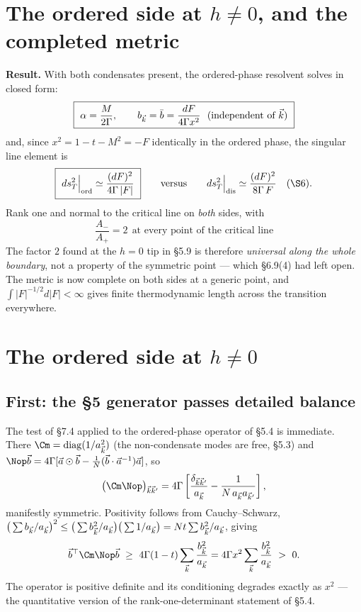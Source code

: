 \section{ The ordered side at $h\neq0$, and the completed metric}

\medskip
\noindent
\textbf{Result.} With both condensates present, the ordered-phase resolvent solves in closed
form:
\begin{equation}
  \boxed{\ \alpha=\frac{M}{2\Gamma},\qquad
   b_{\vec k}=\bar b=\frac{dF}{4\Gamma x^{2}}\ \ \text{(independent of }\vec k)\ }
\end{equation}
and, since $x^{2}=1-t-M^{2}=-F$ identically in the ordered phase, the singular line element
is
\begin{equation}
  \boxed{\ ds_T^{2}\Big|_{\rm ord}\simeq\frac{(dF)^{2}}{4\Gamma\,|F|}\ }
  \qquad\text{versus}\qquad
  ds_T^{2}\Big|_{\rm dis}\simeq\frac{(dF)^{2}}{8\Gamma\,F}\quad(\S6).
\end{equation}
Rank one and normal to the critical line on \emph{both} sides, with
\begin{equation}
  \boxed{\ \frac{A_-}{A_+}=2\ \ \text{at every point of the critical line}\ }
\end{equation}
The factor $2$ found at the $h=0$ tip in \S5.9 is therefore \emph{universal along the whole
boundary}, not a property of the symmetric point --- which \S6.9(4) had left open. The
metric is now complete on both sides at a generic point, and
$\int|F|^{-1/2}d|F|<\infty$ gives finite thermodynamic length across the transition
everywhere.

\section{The ordered side at $h\neq0$}

\subsection{First: the \S5 generator passes detailed balance}
The test of \S7.4 applied to the ordered-phase operator of \S5.4 is immediate. There
$\Cm=\mathrm{diag}(1/a_{\bk}^{2})$ (the non-condensate modes are free, \S5.3) and
$\Nop\vec b=4\Gamma[\vec a\odot\vec b-\tfrac1N(\vec b\cdot\vec a^{-1})\vec a]$, so
\begin{equation}
  \big(\Cm\Nop\big)_{\bk\bk'}=4\Gamma\left[\frac{\delta_{\bk\bk'}}{a_{\bk}}
   -\frac{1}{N\,a_{\bk}a_{\bk'}}\right],
\end{equation}
manifestly symmetric. Positivity follows from Cauchy--Schwarz,
$\big(\sum b_{\vec k}/a_{\vec k}\big)^{2}\le\big(\sum b_{\vec k}^{2}/a_{\vec k}\big)\big(\sum1/a_{\vec k}\big)=Nt\sum b_{\vec k}^{2}/a_{\vec k}$,
giving
\begin{equation}
  \vec b^{\top}\Cm\Nop\vec b\ \ge\ 4\Gamma(1-t)\sum_{\bk}\frac{b_{\bk}^{2}}{a_{\bk}}
   =4\Gamma x^{2}\sum_{\bk}\frac{b_{\bk}^{2}}{a_{\bk}}\ >\ 0 .
\end{equation}
The operator is positive definite and its conditioning degrades exactly as $x^{2}$ --- the
quantitative version of the rank-one-determinant statement of \S5.4.

